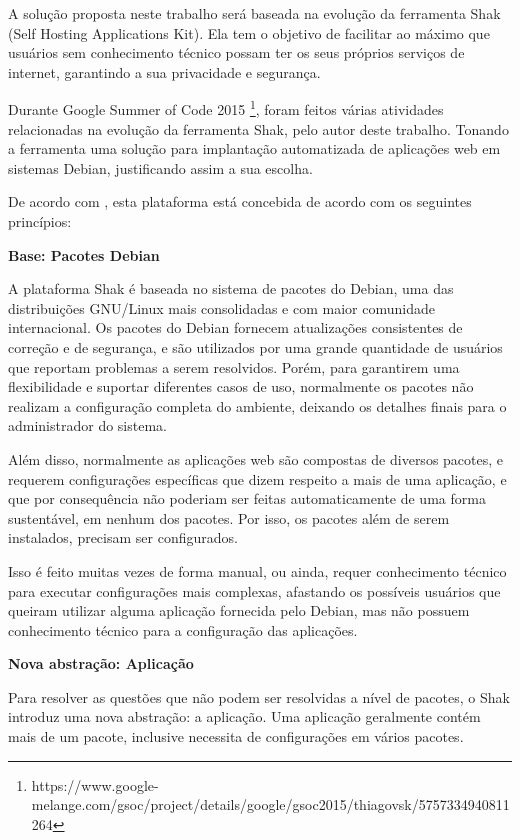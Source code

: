 A solução proposta neste trabalho será baseada na evolução da ferramenta Shak
(Self Hosting Applications Kit). Ela tem o objetivo de facilitar 
ao máximo que usuários sem conhecimento técnico possam ter os seus próprios 
serviços de internet, garantindo a sua privacidade e segurança. 

Durante Google Summer of Code 2015 \footnote{https://www.google-melange.com/gsoc/project/details/google/gsoc2015/thiagovsk/5757334940811264}, foram feitos várias atividades relacionadas na 
evolução da ferramenta Shak, pelo autor deste trabalho. Tonando a ferramenta uma
 solução para implantação automatizada de aplicações web em sistemas Debian, 
justificando assim a sua escolha.

De acordo com , esta plataforma está concebida de acordo 
com os seguintes princípios:

\textbf{Base: Pacotes Debian}

A plataforma Shak é baseada no sistema de pacotes do Debian, uma das distribuições 
GNU/Linux mais consolidadas e com maior comunidade internacional. Os
pacotes do Debian fornecem atualizações consistentes de correção e de segurança,
e são utilizados por uma grande quantidade de usuários que reportam problemas a
serem resolvidos. Porém, para garantirem uma flexibilidade e suportar diferentes
casos de uso, normalmente os pacotes não realizam a configuração completa do ambiente,
deixando os detalhes finais para o administrador do sistema.

Além disso, normalmente as aplicações web são compostas de diversos pacotes, e
requerem configurações específicas que dizem respeito a mais de uma aplicação,
e que por consequência não poderiam ser feitas automaticamente de uma forma sustentável, 
em nenhum dos pacotes. Por isso, os pacotes além de serem instalados, precisam ser configurados.

Isso é feito muitas vezes de forma manual, ou ainda, requer conhecimento técnico
para executar configurações mais complexas, afastando os possíveis usuários
que queiram utilizar alguma aplicação fornecida pelo Debian, mas não possuem
conhecimento técnico para a configuração das aplicações.

\textbf{Nova abstração: Aplicação}

Para resolver as questões que não podem ser resolvidas a nível de pacotes, o
Shak introduz uma nova abstração: a aplicação. Uma aplicação geralmente
contém mais de um pacote, inclusive necessita de configurações em vários pacotes.

